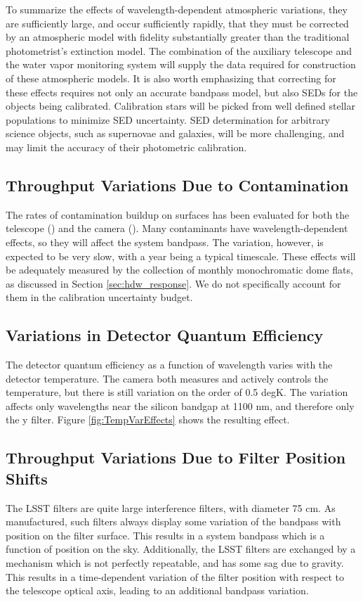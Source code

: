 \documentclass[12pt,preprint]{aastex}
\begin{document}
To summarize the effects of wavelength-dependent atmospheric variations, they are sufficiently large, and occur sufficiently rapidly, that they must be corrected by an atmospheric model with fidelity substantially greater than the traditional photometrist's extinction model.   The combination of the auxiliary telescope and the water vapor monitoring system will supply the data required for construction of these atmospheric models.  It is also worth emphasizing that correcting for these effects requires not only an accurate bandpass model, but also SEDs for the objects being calibrated.   Calibration stars will be picked from well defined stellar populations to minimize SED uncertainty.   SED determination for arbitrary science objects, such as supernovae and galaxies, will be more challenging, and may limit the accuracy of their photometric calibration.

\subsection{Throughput Variations Due to Contamination}
The rates of contamination buildup on surfaces has been evaluated for both the
telescope (\citep{LTS-66}) and the camera (\citep{LCA-18}).  Many contaminants
have wavelength-dependent effects, so they will affect the system bandpass.  The
variation, however, is expected to be very slow, with a year being a typical
timescale.   These effects will be adequately measured by the collection of monthly monochromatic 
dome flats, as discussed in Section \ref{sec:hdw_response}.  
We do not specifically account for them in the calibration uncertainty budget.

\subsection{Variations in Detector Quantum Efficiency}

The detector quantum efficiency as a function of wavelength varies with the detector
temperature.  The camera both measures and actively controls the temperature, but
there is still variation  on the order of 0.5 degK.  The variation affects only 
wavelengths near the silicon bandgap at 1100 nm, and therefore only the y filter.
Figure \ref{fig:TempVarEffects} shows the resulting effect.
	
\subsection{Throughput Variations Due to Filter Position Shifts}
The LSST filters are quite large interference filters, with diameter 75 cm.  
As manufactured, such filters always display some variation of the bandpass
with position on the filter surface.  This results in a system bandpass which
is a function of position on the sky.   Additionally, the LSST filters are
exchanged by a mechanism which is not perfectly repeatable, and has some sag
due to gravity.  This results in a time-dependent variation of the filter
position with respect to the telescope optical axis, leading to an additional
bandpass variation.  
\end{document}
